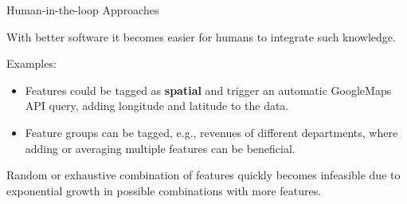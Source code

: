 \begin{vbframe}{Human-in-the-loop Approaches}
    \vspace{+.4cm}
    
    With better software it becomes easier for humans to integrate such knowledge.
    \medskip
    
    Examples:
    \medskip
    
    \begin{itemize}
        \item Features could be tagged as \textbf{spatial} and trigger an automatic GoogleMaps API query, adding longitude and latitude to the data.
        \item Feature groups can be tagged, e.g., revenues of different departments, where adding or averaging multiple features can be beneficial.
    \end{itemize}
    \medskip
    
    Random or exhaustive combination of features quickly becomes infeasible due to exponential growth in possible combinations with more features.
\end{vbframe}





